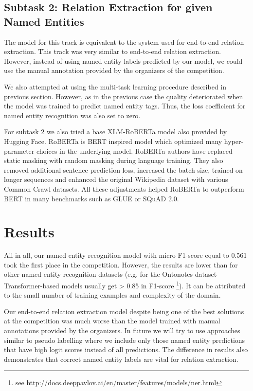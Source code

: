 \documentclass{dialogue}
\begin{document}
	\subsection{Subtask 2: Relation Extraction for given Named Entities}
	The model for this track is equivalent to the system used for end-to-end relation extraction. This track was very similar to end-to-end relation extraction. However, instead of using named entity labels predicted by our model, we could use the manual annotation provided by the organizers of the competition.
	
	We also attempted at using the multi-task learning procedure described in previous section. However, as in the previous case the quality deteriorated when the model was trained to predict named entity tags. Thus, the loss coefficient for named entity recognition was also set to zero.
	
	For subtask 2 we also tried a base XLM-RoBERTa \cite{roberta} model also provided by Hugging Face. RoBERTa is BERT inspired model which optimized many hyper-parameter choices in the underlying model. RoBERTa authors have replaced static masking with random masking during language training. They also removed additional sentence prediction loss, increased the batch size, trained on longer sequences and enhanced the original Wikipedia dataset with various Common Crawl datasets. All these adjustments helped RoBERTa to outperform BERT in many benchmarks such as GLUE or SQuAD 2.0.

	\section{Results}
	All in all, our named entity recognition model with micro F1-score equal to 0.561 took the first place in the competition. However, the results are lower than for other named entity recognition datasets (e.g. for the Ontonotes dataset Transformer-based models usually get > 0.85 in F1-score \footnote{see http://docs.deeppavlov.ai/en/master/features/models/ner.html}). It can be attributed to the small number of training examples and complexity of the domain.
	
	Our end-to-end relation extraction model despite being one of the best solutions at the competition was much worse than the model trained with manual annotations provided by the organizers. In future we will try to use approaches similar to pseudo labelling where we include only those named entity predictions that have high logit scores instead of all predictions. The difference in results also demonstrates that correct named entity labels are vital for relation extraction.
	
\end{document}
